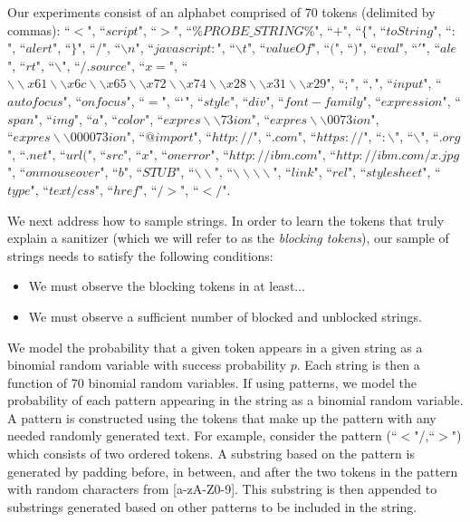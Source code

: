 Our experiments consist of an alphabet comprised of 70 tokens (delimited by commas): ``$<$", ``$script$", ``$>$", ``$\%PROBE\_STRING\%$", ``$+$", ``$\{$", ``$toString$", ``$:$", ``$alert$", ``$\}$", ``$/$", ``$\backslash n$", ``$javascript:$", ``$\backslash t$", ``$valueOf$", ``$($", ``$)$", ``$eval$", ``$'$", ``$ale$", ``$rt$", ``$\backslash $", ``$/.source$", ``$x=$", ``$\backslash \backslash x61\backslash \backslash x6c\backslash \backslash x65\backslash \backslash x72\backslash \backslash x74\backslash \backslash x28\backslash \backslash x31\backslash \backslash x29$", ``$;$", ``$,$", ``$input$", ``$autofocus$", ``$onfocus$", ``$=$", ``$`$", ``$style$", ``$div$", ``$font-family$", ``$expression$", ``$span$", ``$img$", ``$a$", ``$color$", ``$expres\backslash \backslash 73ion$", ``$expres\backslash \backslash 0073ion$", \\``$expres\backslash \backslash 000073ion$", ``$@import$", ``$http://$", ``$.com$", ``$https://$", ``$:\backslash $", ``$\backslash $", ``$.org$", ``$.net$", ``$url($", ``$src$", ``$x$", ``$onerror$", ``$http://ibm.com$", ``$http://ibm.com/x.jpg$", ``$onmouseover$", ``$b$", ``$STUB$", ``$\backslash \backslash $", ``$\backslash \backslash \backslash \backslash $", ``$link$", ``$rel$", ``$stylesheet$", ``$type$", ``$text/css$", ``$href$", ``$/>$", ``$</$".

We next address how to sample strings. In order to learn the tokens that truly explain a sanitizer (which we will refer to as the \emph{blocking tokens}), our sample of strings needs to satisfy the following conditions: 
\begin{itemize}
	\item We must observe the blocking tokens in at least...
	\item We must observe a sufficient number of blocked and unblocked strings. 	
\end{itemize} 
We model the probability that a given token appears in a given string as a binomial random variable with success probability $p$. Each string is then a function of 70 binomial random variables. If using patterns, we model the probability of each pattern appearing in the string as a binomial random variable. A pattern is constructed using the tokens that make up the pattern with any needed randomly generated text.  For example, consider the pattern (``$<$"/,``$>$") which consists of two ordered tokens. A substring based on the pattern is generated by padding before, in between, and after the two tokens in the pattern with random characters from [a-zA-Z0-9]. This substring is then appended to substrings generated based on other patterns to be included in the string. 

